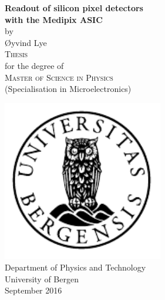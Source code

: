\documentclass[12pt]{report}
\begin{document}
\maketitle

\newcommand{\blankpage}{\newpage{}\thispagestyle{empty}\mbox{}\newpage{}}
\newcommand{\HRule}{\rule{\linewidth}{0.5mm}}

\begin{titlepage}
\begin{center}
{ \Huge \bfseries Readout of silicon pixel detectors \\with the Medipix ASIC}\\[1cm]

\large by\\ \Large Øyvind Lye\\[1.6cm]

\textsc{\Large Thesis}\\
\large for the degree of\\
\textsc{\Large Master of Science in Physics}\\[0.5cm]
\large (Specialisation in Microelectronics) \\[0.5cm]


\end{center}
\vfill
\begin{center}
{
	\includegraphics[width=7cm]{uib-emblem-svart}\\[0.5cm]
	
	\large {Department of Physics and Technology}\\
	\large {University of Bergen}\\[1cm]
	September 2016}
\end{center}
\end{titlepage}
\end{document}

